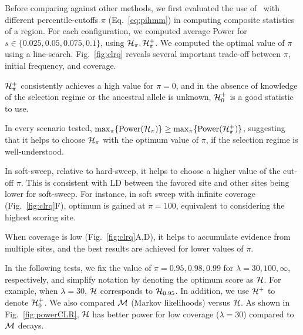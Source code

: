Before comparing against other methods, we first evaluated the use of
\comale\ with different percentile-cutoffs $\pi$ (Eq.~\ref{eq:pihmm})
in computing composite statistics of a region. For each configuration,
we computed average Power for $s\in\{0.025,0.05,0.075,0.1\}$, using
${\cal H}_\pi,{\cal H}^{+}_\pi$. We computed the optimal value of $\pi$ using a
line-search. Fig.~\ref{fig:clrq} reveals several important trade-off
between $\pi$, initial frequency, and coverage.
\begin{packed_itemize}
\item ${\cal H}^{+}_\pi$ consistently achieves a high value for $\pi=0$,
  and in the absence of knowledge of the selection regime or the
  ancestral allele is unknown, ${\cal H}^{+}_0$ is a good statistic to use.
\item In every scenario tested,
  $\max_{\pi}\{\mbox{Power}({\cal H}_\pi)\}\ge
  \max_{\pi}\{\mbox{Power}({\cal H}^{+}_\pi)\}$, suggesting that it helps
  to choose ${\cal H}_{\pi}$ with the optimum value of $\pi$, if the
  selection regime is well-understood.
\item In soft-sweep, relative to hard-sweep, it helps to choose a
  higher value of the cut-off $\pi$. This is consistent with LD
  between the favored site and other sites being lower for
  soft-sweep. For instance, in soft sweep with infinite coverage
  (Fig.~\ref{fig:clrq}F), optimum is gained at $\pi=100$, equivalent
  to considering the highest scoring site.
\item When coverage is low (Fig.~\ref{fig:clrq}A,D), it helps to
  accumulate evidence from multiple sites, and the best results are
  achieved for lower values of $\pi$.
\end{packed_itemize}
In the following tests, we fix the value of $\pi=0.95,0.98, 0.99$ for
$\lambda=30,100,\infty$, respectively, and simplify notation by
denoting the optimum score as ${\cal H}$. For example, when $\lambda=30$,
${\cal H}$ corresponds to ${\cal H}_{0.95}$. In addition, we use ${\cal H}^{+}$ to
denote ${\cal H}^{+}_0$. We also compared ${\cal M}$ (Markov likelihoods) versus
${\cal H}$. As shown in Fig.~\ref{fig:powerCLR}, ${\cal H}$ has better power for
low coverage ($\lambda=30$) compared to ${\cal M}$ decays.



